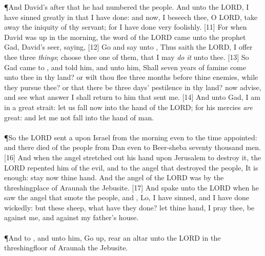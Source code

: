 \P \textcolor[cmyk]{0.99998,1,0,0}{And David's  after that he had numbered the people. And     unto the LORD, I have sinned greatly in that I have done: and now, I beseech thee, O LORD, take away the iniquity of thy servant; for I have done very foolishly.}
[11] \textcolor[cmyk]{0.99998,1,0,0}{For when David was up in the morning, the word of the LORD came unto the prophet Gad, David's seer, saying,}
[12] \textcolor[cmyk]{0.99998,1,0,0}{Go and say unto  , Thus saith the LORD, I offer thee three \emph{things}; choose thee one of them, that I may \emph{do} \emph{it} unto thee.}
[13] \textcolor[cmyk]{0.99998,1,0,0}{So Gad came to  , and told him, and   unto him, Shall seven years of famine come unto thee in thy land? or wilt thou flee three months before thine enemies, while they pursue thee? or that there be three days' pestilence in thy land? now advise, and see what answer I shall return to him that sent me.}
[14] \textcolor[cmyk]{0.99998,1,0,0}{And     unto Gad, I am in a great strait: let us fall now into the hand of the LORD; for his mercies \emph{are} great: and let me not fall into the hand of man.}\\
\\
\P \textcolor[cmyk]{0.99998,1,0,0}{So the LORD sent a  upon Israel from the morning even to the time appointed: and there died of the people from Dan even to Beer-sheba seventy thousand men.}
[16] \textcolor[cmyk]{0.99998,1,0,0}{And when the angel stretched out his hand upon Jerusalem to destroy it, the LORD repented him of the evil, and   to the angel that destroyed the people, It is enough: stay now thine hand. And the angel of the LORD was by the threshingplace of Araunah the Jebusite.}
[17] \textcolor[cmyk]{0.99998,1,0,0}{And   spake unto the LORD when he saw the angel that smote the people, and  , Lo, I have sinned, and I have done wickedly: but these sheep, what have they done? let thine hand, I pray thee, be against me, and against my father's house.}\\
\\
\P \textcolor[cmyk]{0.99998,1,0,0}{And  to  , and   unto him, Go up, rear an altar unto the LORD in the threshingfloor of Araunah the Jebusite.}
